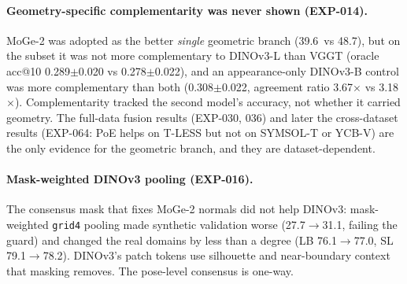 \paragraph{Geometry-specific complementarity was never shown (EXP-014).}
MoGe-2 was adopted as the better \emph{single} geometric branch (39.6\appDdeg\ vs 48.7\appDdeg), but on the subset it was not more complementary to DINOv3-L than VGGT (oracle acc@10 0.289$\pm$0.020 vs 0.278$\pm$0.022), and an appearance-only DINOv3-B control was more complementary than both (0.308$\pm$0.022, agreement ratio 3.67$\times$ vs 3.18$\times$). Complementarity tracked the second model's accuracy, not whether it carried geometry. The full-data fusion results (EXP-030, 036) and later the cross-dataset results (EXP-064: PoE helps on T-LESS but not on SYMSOL-T or YCB-V) are the only evidence for the geometric branch, and they are dataset-dependent.

\paragraph{Mask-weighted DINOv3 pooling (EXP-016).}
The consensus mask that fixes MoGe-2 normals did not help DINOv3: mask-weighted \texttt{grid4} pooling made synthetic validation worse (27.7\appDdeg$\to$31.1\appDdeg, failing the guard) and changed the real domains by less than a degree (LB 76.1$\to$77.0\appDdeg, SL 79.1$\to$78.2\appDdeg). DINOv3's patch tokens use silhouette and near-boundary context that masking removes. The pose-level consensus is one-way.

